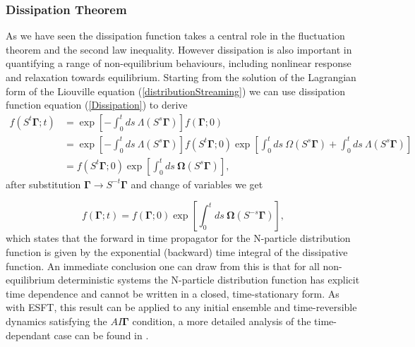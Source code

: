 \documentclass[a4paper,12pt]{article}
\begin{document}
\subsubsection{Dissipation Theorem}
\label{DissipationTheoremSection}
As we have seen the dissipation function takes a central role in the fluctuation theorem and the second law inequality. However dissipation is also important in quantifying a range of non-equilibrium behaviours, including nonlinear response and relaxation towards equilibrium.
Starting from the solution of the Lagrangian form of the Liouville equation (\ref{distributionStreaming}) we can use dissipation function equation (\ref{Dissipation}) to derive
\begin{equation}
\begin{aligned}
  f(S^t\bm{\Gamma};t) &= \exp[-\int_0^t ds\ \Lambda(S^s\bm{\Gamma})]f(\bm{\Gamma};0)\\
  &=\exp[-\int_0^t ds\ \Lambda(S^s\bm{\Gamma})]f(S^t \bm{\Gamma};0) \exp[\int_0^t ds\ \Omega(S^s \bm{\Gamma}) + \int_0^t ds\ \Lambda(S^s\bm{\Gamma})]\\
  &=f(S^t \bm{\Gamma};0) \exp[\int_0^t ds\ \bm{\Omega}(S^s \bm{\Gamma})],
\end{aligned}
\end{equation}
after substitution $\bm{\Gamma} \to S^{-t}\bm{\Gamma}$ and change of variables we get 

\begin{equation}
\label{distributionPropagator}
    f(\bm{\Gamma};t)=f(\bm{\Gamma};0)\exp[\int_0^t ds\ \bm{\Omega}(S^{-s} \bm{\Gamma})],
\end{equation}
which states that the forward in time propagator for the N-particle distribution function is given by the exponential (backward) time integral of the dissipative function. 
An immediate conclusion one can draw from this is that for all non-equilibrium deterministic systems the N-particle distribution function has explicit time dependence and cannot be written in a closed, time-stationary form.
As with ESFT, this result can be applied to any initial ensemble and time-reversible dynamics satisfying the $AI\bm{\Gamma}$ condition, a more detailed analysis of the time-dependant case can be found in \cite{Williams:2008ft}.
\end{document}
